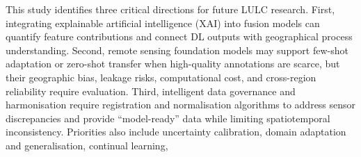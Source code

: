 \documentclass[]{interact}
\theoremstyle{plain}%
\theoremstyle{definition}
\theoremstyle{remark}
\DeclareRobustCommand{\DIFadd}[1]{{\protect\color{DIFaddcolor}\uwave{#1}}}
\DeclareRobustCommand{\DIFdel}[1]{{\protect\color{DIFdelcolor}\sout{#1}}}
\def\DIFadd#1{#1}%
\def\DIFdel#1{}%
\begin{document}
\DIFadd{This} study identifies three critical directions for future LULC research. First, \DIFdel{the} \DIFdel{integration} \DIFdel{of} \DIFdel{Explainable} \DIFdel{Artificial} \DIFdel{Intelligence} \DIFadd{integrating} \DIFadd{explainable} \DIFadd{artificial} \DIFadd{intelligence} (XAI) \DIFdel{is} \DIFdel{paramount}\DIFdel{.} \DIFdel{Future} \DIFdel{frameworks} \DIFdel{must} \DIFdel{move} \DIFdel{beyond} \DIFdel{black} \DIFdel{box} \DIFdel{predictions}\DIFdel{.} \DIFdel{Incorporating} \DIFdel{XAI} into \DIFdel{multi-source} fusion models \DIFdel{will} \DIFdel{allow} \DIFdel{researchers} \DIFdel{to} \DIFadd{can} quantify \DIFdel{the} \DIFdel{specific} \DIFadd{feature} contributions \DIFdel{of} \DIFdel{various} \DIFdel{features}\DIFdel{,} \DIFdel{thereby} \DIFdel{bridging} \DIFdel{the} \DIFdel{current} \DIFdel{gap} \DIFdel{between} \DIFdel{deep} \DIFdel{learning} \DIFadd{and} \DIFadd{connect} \DIFadd{DL} outputs \DIFdel{and} \DIFdel{traditional} \DIFadd{with} geographical process understanding. Second, \DIFdel{there} \DIFdel{is} \DIFdel{an} \DIFdel{urgent} \DIFdel{need} \DIFdel{for} \DIFdel{General} \DIFdel{Remote} \DIFdel{Sensing} \DIFdel{Foundation} \DIFdel{Models}\DIFdel{.} \DIFdel{To} \DIFdel{address} \DIFdel{the} \DIFdel{persistent} \DIFdel{scarcity} \DIFdel{of} \DIFdel{high-quality} \DIFdel{ground} \DIFdel{truth} \DIFdel{annotations}\DIFdel{,} \DIFdel{developing} \DIFdel{large-scale} \DIFadd{remote} \DIFadd{sensing} foundation models \DIFdel{that} \DIFdel{can} \DIFdel{be} \DIFdel{effectively} \DIFdel{fine-tuned} \DIFdel{via} \DIFadd{may} \DIFadd{support} few-shot \DIFadd{adaptation} or zero-shot \DIFdel{learning} \DIFdel{will} \DIFdel{be} \DIFdel{essential} \DIFdel{for} \DIFdel{achieving} \DIFdel{robust} \DIFdel{global} \DIFdel{scale} \DIFdel{monitoring} \DIFadd{transfer} \DIFadd{when} \DIFadd{high-quality} \DIFadd{annotations} \DIFadd{are} \DIFadd{scarce}\DIFadd{,} \DIFadd{but} \DIFadd{their} \DIFadd{geographic} \DIFadd{bias}\DIFadd{,} \DIFadd{leakage} \DIFadd{risks}\DIFadd{,} \DIFadd{computational} \DIFadd{cost}\DIFadd{,} \DIFadd{and} \DIFadd{cross-region} \DIFadd{reliability} \DIFadd{require} \DIFadd{evaluation}. Third, \DIFdel{advancing} \DIFdel{Intelligent} \DIFdel{Data} \DIFdel{Governance} \DIFadd{intelligent} \DIFadd{data} \DIFadd{governance} and \DIFdel{Harmonization} \DIFdel{remains} \DIFdel{a} \DIFdel{core} \DIFdel{technical} \DIFdel{requirement}\DIFdel{.} \DIFdel{Advanced} \DIFadd{harmonisation} \DIFadd{require} registration and \DIFdel{normalization} \DIFadd{normalisation} algorithms \DIFdel{are} \DIFdel{needed} to \DIFdel{resolve} \DIFdel{the} \DIFdel{physical} \DIFadd{address} \DIFadd{sensor} discrepancies \DIFdel{between} \DIFdel{heterogeneous} \DIFdel{sensors}\DIFdel{.} \DIFdel{This} \DIFdel{ensures} \DIFdel{that} \DIFdel{multi-source} \DIFdel{fusion} \DIFdel{occurs} \DIFdel{on} \DIFadd{and} \DIFadd{provide} ``model-ready'' data \DIFdel{that} \DIFdel{preserves} \DIFdel{critical} \DIFdel{fine-grained} \DIFdel{textures} while \DIFdel{eliminating} \DIFadd{limiting} spatiotemporal \DIFdel{noise} \DIFadd{inconsistency}\DIFadd{.} \DIFadd{Priorities} \DIFadd{also} \DIFadd{include} \DIFadd{uncertainty} \DIFadd{calibration}\DIFadd{,} \DIFadd{domain} \DIFadd{adaptation} \DIFadd{and} \DIFadd{generalisation}\DIFadd{,} \DIFadd{continual} \DIFadd{learning}\DIFadd{,} 
\end{document}
